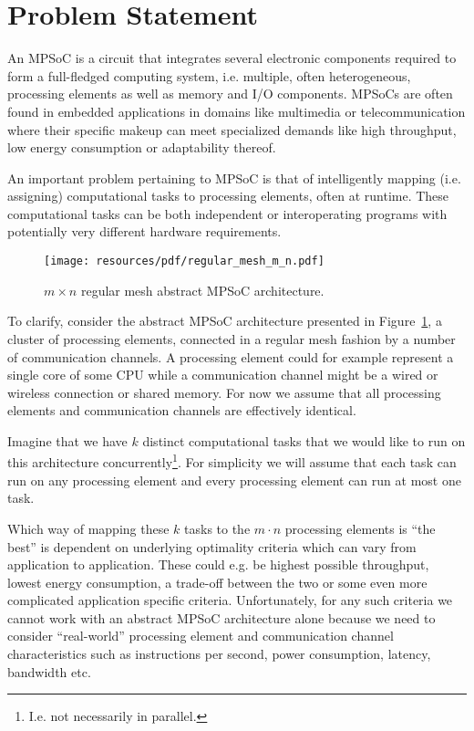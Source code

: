 \section{Problem Statement}
\label{sec:mot_problem_statement}

An MPSoC is a circuit that integrates several electronic components required to
form a full-fledged computing system, i.e. multiple, often heterogeneous,
processing elements as well as memory and I/O components. MPSoCs are often found in
embedded applications in domains like multimedia or telecommunication where
their specific makeup can meet specialized demands like high throughput, low
energy consumption or adaptability thereof.

An important problem pertaining to MPSoC is that of intelligently mapping (i.e.
assigning) computational tasks to processing elements, often at runtime.  These
computational tasks can be both independent or interoperating programs with
potentially very different hardware requirements.

\begin{figure}
  \centering
    \texttt{[image: resources/pdf/regular\_mesh\_m\_n.pdf]}
  \caption{$m \times n$ regular mesh abstract MPSoC architecture.}
  \label{fig:regular_mesh_m_n}
\end{figure}

To clarify, consider the abstract MPSoC architecture presented in
Figure~\ref{fig:regular_mesh_m_n}, a cluster of processing elements, connected
in a regular mesh fashion by a number of communication channels. A processing
element could for example represent a single core of some CPU while a
communication channel might be a wired or wireless connection or shared memory.
For now we assume that all processing elements and communication channels are
effectively identical.

Imagine that we have $k$ distinct computational tasks that we would like to run
on this architecture concurrently\footnote{I.e. not necessarily in parallel.}.
For simplicity we will assume that each task can run on any processing element
and every processing element can run at most one task.

Which way of mapping these $k$ tasks to the $m \cdot n$ processing elements is
``the best'' is dependent on underlying optimality criteria which can vary from
application to application. These could e.g. be highest possible throughput,
lowest energy consumption, a trade-off between the two or some even more
complicated application specific criteria.
%
Unfortunately, for any such criteria we cannot work with an abstract MPSoC
architecture alone because we need to consider ``real-world'' processing
element and communication channel characteristics such as instructions per
second, power consumption, latency, bandwidth etc.

